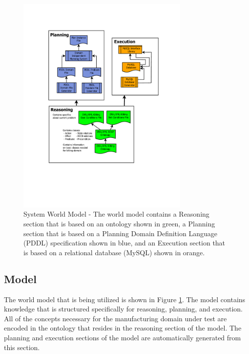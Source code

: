 \begin{figure}[htb!]
\begin{center}
\includegraphics[width=8.5cm]{images/RITAWorldModel.pdf}
\caption{System World Model - The world model contains a Reasoning section that is based on an ontology shown in green,
a Planning section that is based on a Planning Domain Definition Language (PDDL) specification shown in blue, and an Execution section that is based on a relational database (MySQL) shown in orange.}
\label{fig:WorldModel}
\end{center}
\end{figure}
%
\subsection{Model}
\label{subsection:Model}
The world model that is being utilized is shown in Figure \ref{fig:WorldModel}. The model contains knowledge that is structured specifically for
reasoning, planning, and execution. All of the concepts necessary for the manufacturing domain under test are
encoded in the ontology that resides in the reasoning section of the model. The planning and execution sections of the model are automatically generated from
this section.
%
